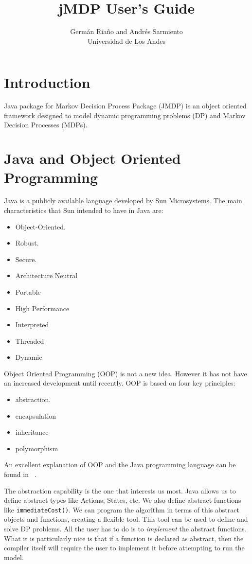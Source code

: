 \documentclass[11pt]{article}
\title{jMDP User's Guide}
\author{  Germ\'an Ria\~no and Andr\'es Sarmiento  \\
Universidad de Los Andes}
\date{}
\begin{document}

\maketitle
\tableofcontents

\section*{Introduction}

Java package for Markov Decision Process Package (JMDP) is an object oriented framework designed to model dynamic programming problems (DP) and Markov Decision Processes (MDPs).

\section{Java and Object Oriented Programming}


Java is a publicly available language developed by Sun
Microsystems. The main characteristics that Sun intended to have in Java
are:
\begin{itemize}
  \item Object-Oriented.
  \item Robust.
  \item Secure.
  \item Architecture Neutral
  \item Portable
  \item High Performance
  \item Interpreted
  \item Threaded
  \item Dynamic
\end{itemize}

Object Oriented Programming  (OOP) is not a new idea. However it has not
have an increased development until recently. OOP is based on four key
principles:
\begin{itemize}
  \item abstraction.
  \item encapsulation
  \item inheritance
  \item polymorphism
\end{itemize}

An excellent explanation of OOP and the Java programming language can be
found in ~\cite{ld:jj}.

The abstraction capability is the one that interests us most. Java allows us to define abstract types like Actions, States, etc. We also define abstract functions like \lstinline!immediateCost()!.  We can program the algorithm in terms of this abstract objects and functions, creating a flexible tool. This tool can be used to define and solve DP problems. All the user has to do is to \textit{implement} the abstract functions. What it is particularly nice is that if a function is declared as abstract, then the compiler itself will require the user to implement it before attempting to run the
model.
\end{document}
